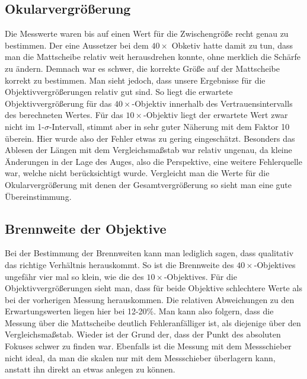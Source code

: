 \documentclass[12pt,a4paper,titlepage,headinclude]{scrartcl}
\numberwithin{equation}{subsection}
\begin{document}
\subsection{Okularvergrößerung}
Die Messwerte waren bis auf einen Wert für die Zwischengröße recht genau zu bestimmen. Der eine Aussetzer bei dem $40\times$ Obketiv hatte damit zu tun, dass man die Mattscheibe relativ weit herausdrehen konnte, ohne merklich die Schärfe zu ändern. Demnach war es schwer, die korrekte Größe auf der Mattscheibe korrekt zu bestimmen. Man sieht jedoch, dass unsere Ergebnisse für die Objektivvergrößerungen relativ gut sind. So liegt die erwartete Objektivvergrößerung für das $40\times$-Objektiv innerhalb des Vertrauensintervalls des berechneten Wertes. Für das $10\times$-Objektiv liegt der erwartete Wert zwar nicht im 1-$\sigma$-Intervall, stimmt aber in sehr guter Näherung mit dem Faktor 10 überein. Hier wurde also der Fehler etwas zu gering eingeschätzt. Besonders das Ablesen der Längen mit dem Vergleichsmaßstab war relativ ungenau, da kleine Änderungen in der Lage des Auges, also die Perspektive, eine weitere Fehlerquelle war, welche nicht berücksichtigt wurde. Vergleicht man die Werte für die Okularvergrößerung mit denen der Gesamtvergrößerung so sieht man eine gute Übereinstimmung.
\subsection{Brennweite der Objektive}
Bei der Bestimmung der Brennweiten kann man lediglich sagen, dass qualitativ das richtige Verhältnis herauskommt. So ist die Brennweite des $40\times$-Objektives ungefähr vier mal so klein, wie die des $10\times$-Objektives. Für die Objektivvergrößerungen sieht man, dass für beide Objektive schlechtere Werte als bei der vorherigen Messung herauskommen. Die relativen Abweichungen zu den Erwartungswerten liegen hier bei 12-20\%. Man kann also folgern, dass die Messung über die Mattscheibe deutlich Fehleranfälliger ist, als diejenige über den Vergleichsmaßstab. Wieder ist der Grund der, dass der Punkt des absoluten Fokuses schwer zu finden war. Ebenfalls ist die Messung mit dem Messschieber nicht ideal, da man die skalen nur mit dem Messschieber überlagern kann, anstatt ihn direkt an etwas anlegen zu können.
\end{document}

